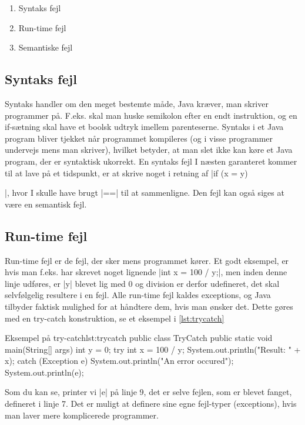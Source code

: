 {\begin{enumerate}
	\item Syntaks fejl
	\item Run-time fejl
	\item Semantiske fejl
\end{enumerate}

\subsection{Syntaks fejl}
Syntaks handler om den meget bestemte måde, Java kræver, man skriver programmer på. F.eks. skal man huske semikolon efter en endt instruktion, og en if-sætning skal have et boolsk udtryk imellem parenteserne. Syntaks i et Java program bliver tjekket når programmet kompileres (og i visse programmer undervejs mens man skriver), hvilket betyder, at man slet ikke kan køre et Java program, der er syntaktisk ukorrekt. En syntaks fejl I næsten garanteret kommer til at lave på et tidspunkt, er at skrive noget i retning af \JavaInline|if (x = y) {|, hvor I skulle have brugt \JavaInline|==| til at sammenligne. Den fejl kan også siges at være en semantisk fejl.

\subsection{Run-time fejl}
Run-time fejl er de fejl, der sker mens programmet kører. Et godt eksempel, er hvis man f.eks. har skrevet noget lignende \JavaInline|int x = 100 / y;|, men inden denne linje udføres, er \JavaInline|y| blevet lig med 0 og division er derfor udefineret, det skal selvfølgelig resultere i en fejl. Alle run-time fejl kaldes exceptions, og Java tilbyder faktisk mulighed for at håndtere dem, hvis man ønsker det. Dette gøres med en try-catch konstruktion, se et eksempel i \autoref{lst:trycatch}

\begin{JavaCode}{Eksempel på try-catch}{lst:trycatch}
	public class TryCatch {
		public static void main(String[] args) {
			int y = 0;
			try {
				int x = 100 / y;
				System.out.println("Result: " + x); 
			} catch (Exception e) {
				System.out.println("An error occured");
				System.out.println(e);
			}
		}
	}
	
\end{JavaCode}

\begin{remark}
	Som du kan se, printer vi \JavaInline|e| på linje 9, det er selve fejlen, som er blevet fanget, defineret i linje 7. Det er muligt at definere sine egne fejl-typer (exceptions), hvis man laver mere komplicerede programmer.
	

\end{remark}}}
